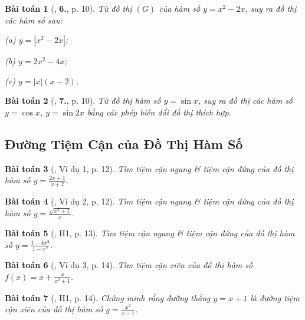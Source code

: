\documentclass[12pt]{article}
\numberwithin{equation}{section}
\newtheorem{baitoan}{Bài toán}[section]
\begin{document}
\begin{baitoan}[\cite{TL_chuyen_Toan_Giai_Tich_12}, \textbf{6.}, p. 10]
	Từ đồ thị $(G)$ của hàm số $y = x^2 - 2x$, suy ra đồ thị các hàm số sau:
	\begin{enumerate*}
		\item[(a)] $y = |x^2 - 2x|$;
		\item[(b)] $y = 2x^2 - 4x$;
		\item[(c)] $y = |x|(x - 2)$.
	\end{enumerate*}
\end{baitoan}

\begin{baitoan}[\cite{TL_chuyen_Toan_Giai_Tich_12}, \textbf{7.}, p. 10]
	Từ đồ thị hàm số $y = \sin x$, suy ra đồ thị các hàm số $y = \cos x$, $y = \sin 2x$ bằng các phép biến đổi đồ thị thích hợp.
\end{baitoan}


\subsection{Đường Tiệm Cận của Đồ Thị Hàm Số}

\begin{baitoan}[\cite{TL_chuyen_Toan_Giai_Tich_12}, Ví dụ 1, p. 12]
	Tìm tiệm cận ngang \& tiệm cận đứng của đồ thị hàm số $y = \frac{2x + 1}{x + 2}$.
\end{baitoan}

\begin{baitoan}[\cite{TL_chuyen_Toan_Giai_Tich_12}, Ví dụ 2, p. 12]
	Tìm tiệm cận ngang \& tiệm cận đứng của đồ thị hàm số $y = \frac{\sqrt{x^2 + 1}}{x}$.
\end{baitoan}

\begin{baitoan}[\cite{TL_chuyen_Toan_Giai_Tich_12}, H1, p. 13]
	Tìm tiệm cận ngang \& tiệm cận đứng của đồ thị hàm số $y = \frac{1 - 4x^2}{1 - x^2}$.
\end{baitoan}

\begin{baitoan}[\cite{TL_chuyen_Toan_Giai_Tich_12}, Ví dụ 3, p. 14]
	Tìm tiệm cận xiên của đồ thị hàm số $f(x) = x + \frac{x}{x^2 + 1}$.
\end{baitoan}

\begin{baitoan}[\cite{TL_chuyen_Toan_Giai_Tich_12}, H1, p. 14]
	Chứng minh rằng đường thẳng $y = x + 1$ là đường tiệm cận xiên của đồ thị hàm số $y = \frac{x^2}{x - 1}$.
\end{baitoan}
\end{document}

